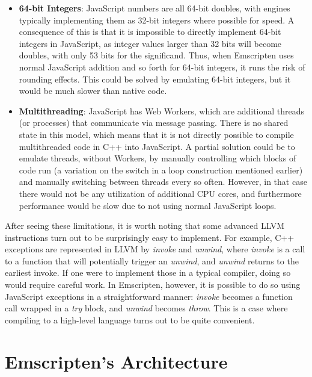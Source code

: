 \documentclass[preprint,10pt]{sigplanconf}
\begin{document}
\begin{itemize}
\item \textbf{64-bit Integers}: JavaScript numbers are all 64-bit doubles, with engines
      typically implementing them as 32-bit integers where possible for speed.
      A consequence of this is that it is impossible to directly implement
      64-bit integers in JavaScript, as integer values larger than 32 bits will become doubles,
      with only 53 bits for the significand. Thus, when Emscripten uses normal
      JavaScript addition and so forth for 64-bit integers, it runs the risk of
      rounding effects. This could be solved by emulating 64-bit integers,
      but it would be much slower than native code.
\item \textbf{Multithreading}: JavaScript has Web Workers, which are additional
      threads (or processes) that communicate via message passing. There is no
      shared state in this model, which means that it is not directly possible
      to compile multithreaded code in C++ into JavaScript. A partial solution
      could be to emulate threads, without Workers, by manually controlling
      which blocks of code run (a variation on the switch in a loop construction
      mentioned earlier) and manually switching between threads every so often.
      However, in that case there would not be any utilization
      of additional CPU cores, and furthermore performance would be slow due to not
      using normal JavaScript loops.
\end{itemize}

After seeing these limitations, it is worth noting that some advanced LLVM instructions turn out to be
surprisingly easy to implement. For example, C++ exceptions are represented in
LLVM by \emph{invoke} and \emph{unwind}, where \emph{invoke} is a call to a function that will
potentially trigger an \emph{unwind}, and \emph{unwind} returns to the earliest invoke.
If one were to implement those
in a typical compiler, doing so would require careful work. In Emscripten, however,
it is possible to do so using JavaScript exceptions in a straightforward manner:
\emph{invoke} becomes a function call wrapped in a \emph{try} block, and \emph{unwind}
becomes \emph{throw}. This is a case where compiling to a high-level language turns
out to be quite convenient.

\section{Emscripten's Architecture}
\label{sec:emarch}
\end{document}

